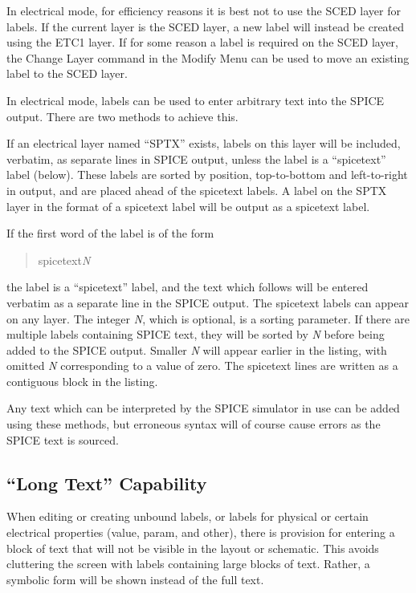 In electrical mode, for efficiency reasons it is best not to use the
SCED layer for labels.  If the current layer is the SCED layer, a new
label will instead be created using the ETC1 layer.  If for some
reason a label is required on the SCED layer, the {\cb Change Layer}
command in the {\cb Modify Menu} can be used to move an existing label
to the SCED layer.

In electrical mode, labels can be used to enter arbitrary text into
the SPICE output.  There are two methods to achieve this.

If an electrical layer named ``SPTX'' exists, labels on this layer
will be included, verbatim, as separate lines in SPICE output, unless
the label is a ``spicetext'' label (below).  These labels are sorted
by position, top-to-bottom and left-to-right in output, and are placed
ahead of the spicetext labels.  A label on the SPTX layer in the
format of a spicetext label will be output as a spicetext label.

If the first word of the label is of the form
\begin{quote}\vt
spicetext{\it N}
\end{quote}
the label is a ``spicetext'' label, and the text which follows will be
entered verbatim as a separate line in the SPICE output.  The
spicetext labels can appear on any layer.  The integer {\it N\/},
which is optional, is a sorting parameter.  If there are multiple
labels containing SPICE text, they will be sorted by {\it N\/} before
being added to the SPICE output.  Smaller {\it N\/} will appear
earlier in the listing, with omitted {\it N\/} corresponding to a
value of zero.  The {\vt spicetext\/} lines are written as a
contiguous block in the listing.

Any text which can be interpreted by the SPICE simulator in use can be
added using these methods, but erroneous syntax will of course cause
errors as the SPICE text is sourced.

\subsection{``Long Text'' Capability}
\label{longtext}

When editing or creating unbound labels, or labels for physical or
certain electrical properties ({\et value}, {\et param}, and {\et
other}), there is provision for entering a block of text that will not
be visible in the layout or schematic.  This avoids cluttering the
screen with labels containing large blocks of text.  Rather, a
symbolic form will be shown instead of the full text.

